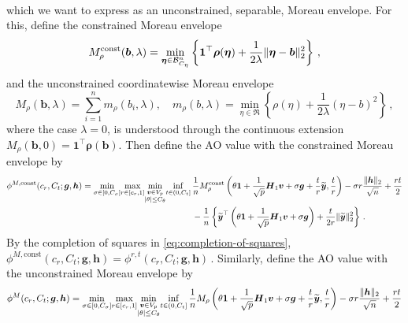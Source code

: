\documentclass{article}
\makeatletter
\theoremstyle{definition}
\newcommand{\vnorm}[1]{%
	\ensuremath{%
		\if@display
		\left\| #1 \right\|
		\else
		\| #1 \|
		\fi
	}%
}
\newcommand{\abs}[1]{%
	\ensuremath{%
		\if@display
		\left| #1 \right|
		\else
		\lvert #1 \rvert
		\fi
	}%
}
\newcommand*{\bb}{\boldsymbol}
\def\bH {\bb{H}}
\def\bv{\bb{v}}
\def\bh{\bb{h}}
\def\bg{\bb{g}}
\def\bYtil{\widetilde{\bb{y}}}
\def\bH{\bb{H}}
\makeatother
\begin{document}
\begin{bibunit}
\begin{equation}
\begin{aligned}
	\end{aligned}
\end{equation}
which we want to express as an unconstrained, separable, Moreau envelope. 
For this, define the constrained Moreau envelope
$$
	M_{\rho}^{\mathrm{const}}(\bb b,\lambda)
	=
	\underset{\bb\eta\in\mathcal B^n_{C_\eta}}{\min}
	\left\{
		\bb1^\top\bb\rho(\bb\eta)
		+
		\frac{1}{2\lambda}
		\vnorm{\bb\eta-\bb b}_2^2
	\right\} \,,
$$
and the unconstrained coordinatewise Moreau envelope
$$
	M_{\rho}(\bb b,\lambda)
	=
	\sum_{i=1}^n m_\rho(b_i,\lambda),
	\quad
	m_\rho(b,\lambda)
	=
	\underset{\eta\in\Re}{\min}
	\left\{
		\rho(\eta)
		+
		\frac{1}{2\lambda}(\eta-b)^2
	\right\} \,,
$$
where the case $\lambda=0$, is understood through the continuous extension $M_\rho(\bb b,0)=\bb1^\top\bb\rho(\bb b)$.
Then define the AO value with the constrained Moreau envelope by
$$
\begin{aligned}
	\phi^{M,\mathrm{const}}(c_r,C_t;\bg,\bh)
	=
	\underset{\sigma\in[0,C_\sigma]}{\min}
	\underset{r\in[c_r,1]}{\max}
	\underset{\substack{\bv\in V_p\\ \abs{\theta}\leq C_\theta}}{\min}
	\underset{t\in(0,C_t]}{\inf} \,
	&\frac1n
	M_\rho^{\mathrm{const}}
	\left(
			\theta\bb1
	+
	\frac1{\sqrt p}\bH_1\bv
	+
	\sigma\bg
	+
	\frac tr\bYtil ,
		\frac tr
	\right)
	-\sigma r\frac{\vnorm{\bh}_2}{\sqrt n} +
	\frac{rt}{2} 
	\\
	&-
	\frac1n
	\left\{
		\bYtil^\top
		\left(
			\theta\bb1+\frac1{\sqrt p}\bH_1\bv+\sigma\bg
		\right)
		+
		\frac{t}{2r}\vnorm{\bYtil}_2^2
	\right\} \,.
\end{aligned}
$$
By the completion of squares in \eqref{eq:completion-of-squares}, $\phi^{M,\mathrm{const}}(c_r,C_t;\bg,\bh) = \phi^{r,t}(c_r,C_t;\bg,\bh) \,.$
Similarly, define the AO value with the unconstrained Moreau envelope by
$$
\begin{aligned}
	\phi^{M}(c_r,C_t;\bg,\bh)
	=
	\underset{\sigma\in[0,C_\sigma]}{\min}
	\underset{r\in[c_r,1]}{\max}
	\underset{\substack{\bv\in V_p\\ \abs{\theta}\leq C_\theta}}{\min}
	\underset{t\in(0,C_t]}{\inf} \,
	&\frac1n
	M_\rho
	\left(
			\theta\bb1
	+
	\frac1{\sqrt p}\bH_1\bv
	+
	\sigma\bg
	+
	\frac tr\bYtil ,
		\frac tr
	\right)
	-\sigma r\frac{\vnorm{\bh}_2}{\sqrt n} +
	\frac{rt}{2} 
	\\

\end{aligned}$$
\end{bibunit}
\end{document}
